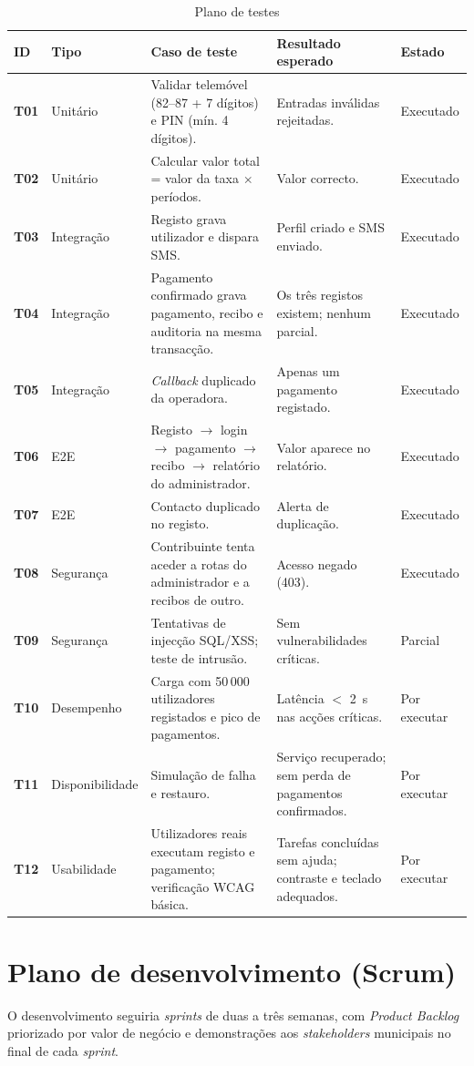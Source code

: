 \documentclass[12pt,a4paper,openany]{report}
\begin{document}
\begin{table}[!htbp]
\caption{Plano de testes}\label{tab:testes}
\begingroup\singlespacing\small
\begin{tabularx}{\textwidth}{@{}>{\bfseries}p{1cm}p{1.9cm}Xp{3cm}p{1.8cm}@{}}
\toprule
ID & Tipo & Caso de teste & Resultado esperado & Estado \\
\midrule
T01 & Unitário & Validar telemóvel (82--87 + 7 dígitos) e PIN (mín. 4 dígitos). & Entradas inválidas rejeitadas.  & Executado \\
T02 & Unitário & Calcular valor total = valor da taxa $\times$ períodos. & Valor correcto.  & Executado \\
T03 & Integração & Registo grava utilizador e dispara SMS. & Perfil criado e SMS enviado.  & Executado \\
T04 & Integração & Pagamento confirmado grava pagamento, recibo e auditoria na mesma transacção. & Os três registos existem; nenhum parcial.  & Executado \\
T05 & Integração & \emph{Callback} duplicado da operadora. & Apenas um pagamento registado.  & Executado \\
T06 & E2E & Registo $\to$ login $\to$ pagamento $\to$ recibo $\to$ relatório do administrador. & Valor aparece no relatório.  & Executado \\
T07 & E2E & Contacto duplicado no registo. & Alerta de duplicação.  & Executado \\
T08 & Segurança & Contribuinte tenta aceder a rotas do administrador e a recibos de outro. & Acesso negado (403).  & Executado \\
T09 & Segurança & Tentativas de injecção SQL/XSS; teste de intrusão. & Sem vulnerabilidades críticas.  & Parcial \\
T10 & Desempenho & Carga com 50\,000 utilizadores registados e pico de pagamentos. & Latência $<$ 2~s nas acções críticas.  & Por executar \\
T11 & Disponibilidade & Simulação de falha e restauro. & Serviço recuperado; sem perda de pagamentos confirmados.  & Por executar \\
T12 & Usabilidade & Utilizadores reais executam registo e pagamento; verificação WCAG básica. & Tarefas concluídas sem ajuda; contraste e teclado adequados.  & Por executar \\
\bottomrule
\end{tabularx}
\endgroup
\end{table}

\section{Plano de desenvolvimento (Scrum)}
\label{sec:scrum}
O desenvolvimento seguiria \emph{sprints} de duas a três semanas, com \emph{Product Backlog} priorizado por valor de negócio e demonstrações aos \emph{stakeholders} municipais no final de cada \emph{sprint}.
\end{document}
